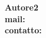 \begin{titlepage}
\begin{textblock*}{15cm}
\begin{multicols}{2}
\begin{large}
                \columnbreak

				
                {\color{white}\begin{large}
                    \noindent \textbf{Autore2} \makeatletter \@companyname \makeatother\\
                    \textbf{mail:} \makeatletter \@companyplace \makeatother\\
                    \textbf{contatto:} \makeatletter \@companytutor \makeatother
                \end{large}}
            \end{large}
        \end{multicols}
    \end{textblock*}
\end{titlepage}

